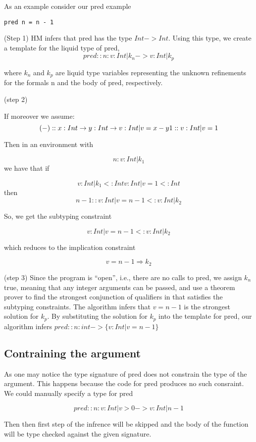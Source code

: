 As an example consider our pred example

\begin{verbatim}
pred n = n - 1
\end{verbatim}

(Step 1) HM infers that pred has the type $Int -> Int$.
Using this type, we create a template for the liquid type of pred,
$$
pred :: n:{v:Int | k_n} -> {v:Int | k_p}
$$

where $k_n$ and $k_p$
are liquid type variables representing the unknown refinements for the formals n
 and the body of pred, respectively.


(step 2)

If moreover we assume:
$$
(-) :: x:Int -> y:Int -> {v:Int | v = x - y}\\ 
1 :: {v:Int | v = 1}
$$

Then in an environment with 

$$
n:{v:Int | k_1}
$$
we have that if 

$$
{v:Int | k_1} <: Int
{v:Int | v = 1} <: Int
$$
then 
$$
n - 1 :: {v:Int | v = n - 1} <: {v:Int | k_2}
$$

So, we get the subtyping constraint 

$$
{v:Int | v = n - 1} <: {v:Int | k_2}
$$

which reduces to the implication constraint 

$$
v = n - 1 \Rightarrow k_2
$$

(step 3)
Since the program is ``open'', i.e., there are no calls to pred,
we assign $k_n$ true, meaning that any integer arguments can be
passed, and use a theorem prover to find the strongest conjunction
of qualifiers in \qset
that satisfies the subtyping constraints. 
The algorithm
infers that $v = n-1$ is the strongest solution for $k_p$.
By substituting the solution for $k_p$ into
the template for pred, our algorithm infers
$pred :: n:int -> \{v :Int | v = n-1 \}$


\subsection*{Contraining the argument}
As one may notice the type signature of pred does not constrain the type of the argument.
This happens because the code for pred produces no such consraint.
We could manually specify a type for pred

$$
pred :: n:{v:Int | v > 0} -> {v:Int | n - 1}
$$

Then then first step of the infrence will be skipped and the 
body of the function will be type checked against the given signature.

